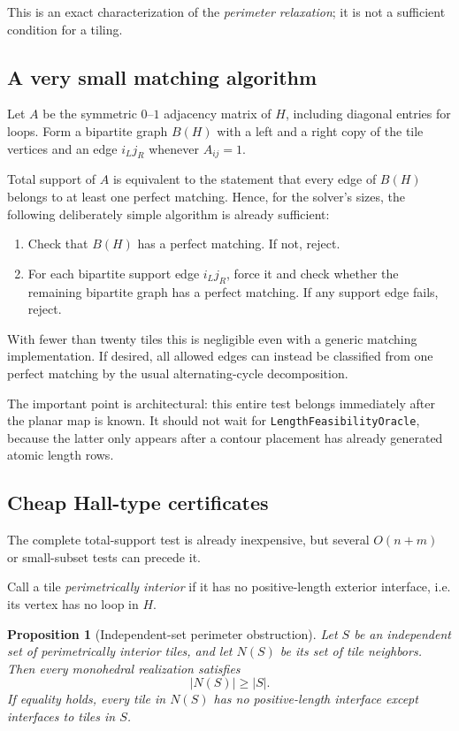 \documentclass[11pt]{article}
\newtheorem{proposition}[theorem]{Proposition}
\theoremstyle{definition}
\theoremstyle{remark}
\begin{document}
This is an exact characterization of the \emph{perimeter relaxation}; it is not a sufficient condition for a tiling.

\subsection{A very small matching algorithm}

Let $A$ be the symmetric $0$--$1$ adjacency matrix of $H$, including diagonal entries for loops.  Form a bipartite graph $B(H)$ with a left and a right copy of the tile vertices and an edge $i_Lj_R$ whenever $A_{ij}=1$.

Total support of $A$ is equivalent to the statement that every edge of $B(H)$ belongs to at least one perfect matching.  Hence, for the solver's sizes, the following deliberately simple algorithm is already sufficient:
\begin{enumerate}
\item Check that $B(H)$ has a perfect matching.  If not, reject.
\item For each bipartite support edge $i_Lj_R$, force it and check whether the remaining bipartite graph has a perfect matching.  If any support edge fails, reject.
\end{enumerate}
With fewer than twenty tiles this is negligible even with a generic matching implementation.  If desired, all allowed edges can instead be classified from one perfect matching by the usual alternating-cycle decomposition.

The important point is architectural: this entire test belongs immediately after the planar map is known.  It should not wait for \texttt{LengthFeasibilityOracle}, because the latter only appears after a contour placement has already generated atomic length rows.

\subsection{Cheap Hall-type certificates}

The complete total-support test is already inexpensive, but several $O(n+m)$ or small-subset tests can precede it.

Call a tile \emph{perimetrically interior} if it has no positive-length exterior interface, i.e. its vertex has no loop in $H$.

\begin{proposition}[Independent-set perimeter obstruction]
\label{prop:hall}
Let $S$ be an independent set of perimetrically interior tiles, and let $N(S)$ be its set of tile neighbors.  Then every monohedral realization satisfies
\[
  |N(S)|\ge |S|.
\]
If equality holds, every tile in $N(S)$ has no positive-length interface except interfaces to tiles in $S$.
\end{proposition}
\end{document}
